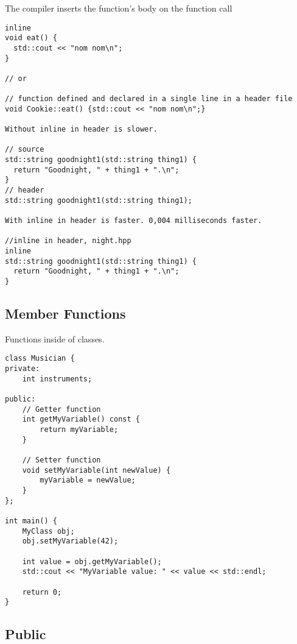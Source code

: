 \documentclass[openany]{report}
\begin{document}
The compiler inserts the function’s body on the function call

\begin{verbatim}
inline 
void eat() {
  std::cout << "nom nom\n";
}

// or

// function defined and declared in a single line in a header file
void Cookie::eat() {std::cout << "nom nom\n";}

Without inline in header is slower.

// source
std::string goodnight1(std::string thing1) {
  return "Goodnight, " + thing1 + ".\n";
}
// header
std::string goodnight1(std::string thing1);

With inline in header is faster. 0,004 milliseconds faster.

//inline in header, night.hpp
inline
std::string goodnight1(std::string thing1) {
  return "Goodnight, " + thing1 + ".\n";
}
\end{verbatim}

\subsection{Member Functions}

Functions inside of classes.

\begin{verbatim}
class Musician {
private:
    int instruments;

public:
    // Getter function
    int getMyVariable() const {
        return myVariable;
    }

    // Setter function
    void setMyVariable(int newValue) {
        myVariable = newValue;
    }
};

int main() {
    MyClass obj;
    obj.setMyVariable(42);

    int value = obj.getMyVariable();
    std::cout << "MyVariable value: " << value << std::endl;

    return 0;
}
\end{verbatim}

\subsection{Public}
\end{document}
